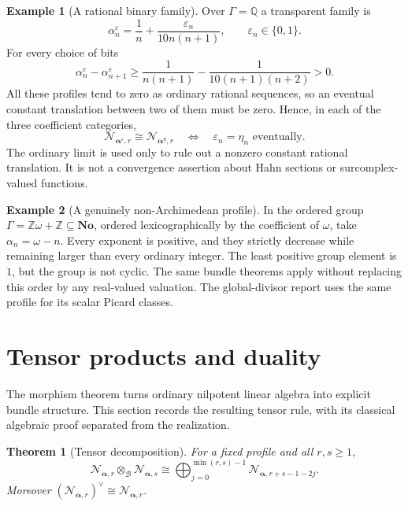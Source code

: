 \documentclass[11pt,letterpaper]{article}
\newtheorem{theorem}{Theorem}[section]
\theoremstyle{definition}
\newtheorem{example}[example]{Example}
\theoremstyle{remark}
\newcommand{\Q}{\mathbb Q}
\newcommand{\Z}{\mathbb Z}
\newcommand{\No}{\mathbf{No}}
\newcommand{\BB}{\mathscr B}
\newcommand{\profile}{\boldsymbol\alpha}
\newcommand{\NN}[1]{\mathcal N_{\profile,#1}}
\numberwithin{equation}{section}
\begin{document}
\begin{example}[A rational binary family]\label{nab:loc:ex:binary}
Over $\Gamma=\Q$ a transparent family is
\begin{equation}\label{nab:loc:eq:binary-profile}
 \alpha_n^{\varepsilon}=\frac1n+\frac{\varepsilon_n}{10n(n+1)},
 \qquad \varepsilon_n\in\{0,1\}.
\end{equation}
For every choice of bits
\[
 \alpha_n^{\varepsilon}-\alpha_{n+1}^{\varepsilon}
 \geq\frac1{n(n+1)}-\frac1{10(n+1)(n+2)}>0.
\]
All these profiles tend to zero as ordinary rational sequences, so an eventual
constant translation between two of them must be zero. Hence, in each of the
three coefficient categories,
\begin{equation}\label{nab:loc:eq:binary-class}
 \mathcal N_{\boldsymbol\alpha^{\varepsilon},r}
 \cong\mathcal N_{\boldsymbol\alpha^{\eta},r}
 \quad\Longleftrightarrow\quad
 \varepsilon_n=\eta_n\text{ eventually}.
\end{equation}
The ordinary limit is used only to rule out a nonzero constant rational
translation. It is not a convergence assertion about Hahn sections or
surcomplex-valued functions.
\end{example}

\begin{example}[A genuinely non-Archimedean profile]\label{nab:loc:ex:omega-profile}
In the ordered group $\Gamma=\Z\omega+\Z\subseteq\No$, ordered
lexicographically by the coefficient of $\omega$, take $\alpha_n=\omega-n$.
Every exponent is positive, and they strictly decrease while remaining larger
than every ordinary integer. The least positive group element is $1$, but the
group is not cyclic. The same bundle theorems apply without replacing this
order by any real-valued valuation. The global-divisor report uses the same
profile for its scalar Picard classes.
\end{example}

\section{Tensor products and duality}\label{nab:loc:sec:tensors}

The morphism theorem turns ordinary nilpotent linear algebra into explicit
bundle structure. This section records the resulting tensor rule, with its
classical algebraic proof separated from the realization.

\begin{theorem}[Tensor decomposition]\label{nab:loc:thm:tensor}
For a fixed profile and all $r,s\geq1$,
\begin{equation}\label{nab:loc:eq:tensor-law}
 \NN r\otimes_{\BB}\NN s
 \cong\bigoplus_{j=0}^{\min(r,s)-1}\NN{r+s-1-2j}.
\end{equation}
Moreover $(\NN r)^\vee\cong\NN r$.
\end{theorem}
\end{document}
